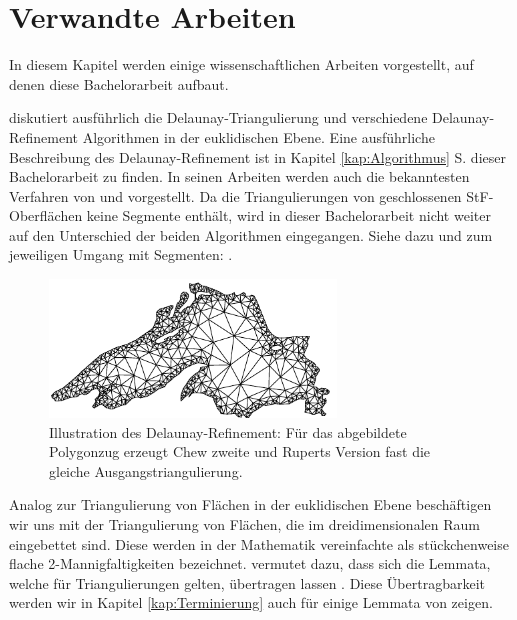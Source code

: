 \chapter{Verwandte Arbeiten}


In diesem Kapitel werden einige wissenschaftlichen Arbeiten vorgestellt,
auf denen diese Bachelorarbeit aufbaut.

\citeauthor{SHEWCHUK:2002:chuws} diskutiert ausführlich die Delaunay-Triangulierung und verschiedene Delaunay-Refinement Algorithmen in der euklidischen Ebene. Eine ausführliche Beschreibung des Delaunay-Refinement ist in Kapitel \ref{kap:Algorithmus} S.\pageref{kap:Algorithmus} dieser Bachelorarbeit zu finden.
In seinen Arbeiten werden auch die bekanntesten Verfahren von \citet{chew:1993:guaranteed,chew:1989:guaranteed} und \citet{ruppert:1995:delaunay} vorgestellt.
Da die Triangulierungen von geschlossenen StF-Oberflächen keine Segmente enthält, wird in dieser Bachelorarbeit nicht weiter auf den Unterschied der beiden Algorithmen eingegangen. Siehe dazu und zum jeweiligen Umgang mit Segmenten: \citeauthor{shewchuk:1997:delaunay}.\\
\begin{figure}[h]%
    \centering
  \includegraphics[width=3in]{images/tripslg.png}
  \caption{Illustration des Delaunay-Refinement:
  Für das abgebildete Polygonzug erzeugt Chew zweite und Ruperts Version fast die gleiche Ausgangstriangulierung\cite{SHEWCHUK:2002:chuws}.}
\end{figure} 

Analog zur Triangulierung von Flächen in der euklidischen Ebene beschäftigen wir uns mit der Triangulierung \cite{Bobenko:2007:LaplaceBeltrami} von Flächen, die im dreidimensionalen Raum eingebettet sind. Diese werden in der Mathematik  vereinfachte als stückchenweise flache 2-Mannigfaltigkeiten  \cite{betke:1984:2-Mannigfaltigkeiten} bezeichnet.
\citeauthor{SHEWCHUK:2002:chuws} vermutet dazu, dass sich die Lemmata, welche für Triangulierungen gelten, übertragen lassen \cite[abschnitte 5.3.2]{SHEWCHUK:2002:chuws}. Diese Übertragbarkeit werden wir in Kapitel \ref{kap:Terminierung}  auch für einige Lemmata von \citet{ruppert:1995:delaunay} zeigen.\\  

